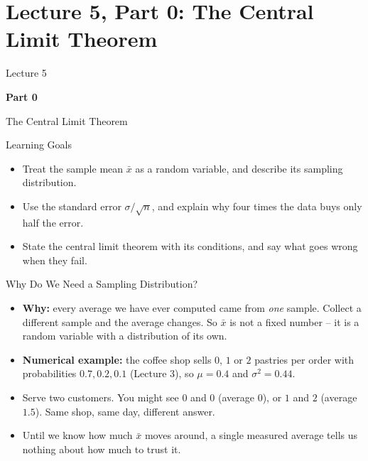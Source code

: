 \section{Lecture 5, Part 0: The Central Limit Theorem}

\begin{frame}
\vfill
\centering
{\color{RLBlue}\large Lecture 5}

\vspace{0.3em}
{\color{RLBlue}\Large\bfseries Part 0}

\vspace{0.6em}
{\Large The Central Limit Theorem}
\vfill
\end{frame}

\begin{frame}{Learning Goals}
\begin{itemize}
  \item Treat the sample mean $\bar{x}$ as a random variable, and describe its sampling distribution.
  \pause
  \item Use the standard error $\sigma/\sqrt{n}$, and explain why four times the data buys only half the error.
  \pause
  \item State the central limit theorem with its conditions, and say what goes wrong when they fail.
\end{itemize}
\end{frame}

\begin{frame}{Why Do We Need a Sampling Distribution?}
\begin{itemize}
  \item \textbf{Why:} every average we have ever computed came from \emph{one} sample. Collect a different sample and the average changes. So $\bar{x}$ is not a fixed number -- it is a random variable with a distribution of its own.
  \pause
  \item \textbf{Numerical example:} the coffee shop sells $0$, $1$ or $2$ pastries per order with probabilities $0.7, 0.2, 0.1$ (Lecture 3), so $\mu = 0.4$ and $\sigma^2 = 0.44$.
  \pause
  \item Serve two customers. You might see $0$ and $0$ (average $0$), or $1$ and $2$ (average $1.5$). Same shop, same day, different answer.
  \pause
  \item Until we know how much $\bar{x}$ moves around, a single measured average tells us nothing about how much to trust it.
\end{itemize}
\end{frame}

